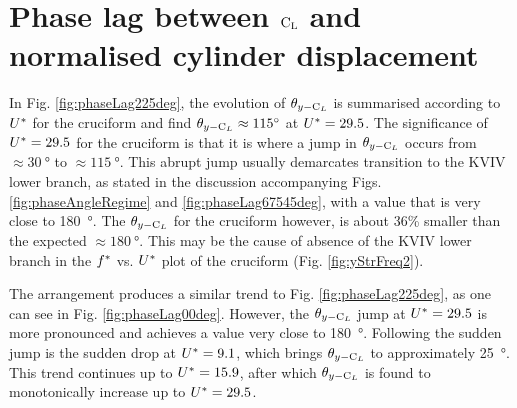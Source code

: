 \documentclass[oneside]{utmthesis}
\begin{document}
\section{Phase lag between $\text{C}_{\text{L}}$ and normalised cylinder displacement} \label{sec:phaseLag22500}
In Fig. \ref{fig:phaseLag225deg}, the evolution of $\theta_{y-\text{C}_{L}}$ is summarised according to $U^{*}$ for the \angtw{} cruciform and find $\plag \approx \SI{115}{\degree}$ at $U^{*} = 29.5$. The significance of $U^{*} = 29.5$ for the \angtw{} cruciform is that it is where a jump in $\theta_{y-\text{C}_{L}}$ occurs from $\approx \SI{30}{\degree}$ to $\approx \SI{115}{\degree}$. This abrupt jump usually demarcates transition to the KVIV lower branch, as stated in the discussion accompanying Figs. \ref{fig:phaseAngleRegime} and \ref{fig:phaseLag67545deg}, with a value that is very close to \SI{180}{\degree}. The $\theta_{y-\text{C}_{L}}$ for the \angtw{} cruciform however, is about 36\% smaller than the expected $\approx \SI{180}{\degree}$. This may be the cause of absence of the KVIV lower branch in the $f^{*}$ vs. $U^{*}$ plot of the \angtw{} cruciform (Fig. \ref{fig:yStrFreq2}).

The \angon{} arrangement produces a similar trend to Fig. \ref{fig:phaseLag225deg}, as one can see in Fig. \ref{fig:phaseLag00deg}. However, the $\theta_{y-\text{C}_{L}}$ jump at  $U^{*} =29.5$ is more pronounced and achieves a value very close to \SI{180}{\degree}. Following the sudden jump is the sudden drop at $U^{*} = 9.1$, which brings $\theta_{y-\text{C}_{L}}$ to approximately \SI{25}{\degree}. This trend continues up to $U^{*} = 15.9$, after which $\theta_{y-\text{C}_{L}}$ is found to monotonically increase up to $U^{*} = 29.5$.
\end{document}
